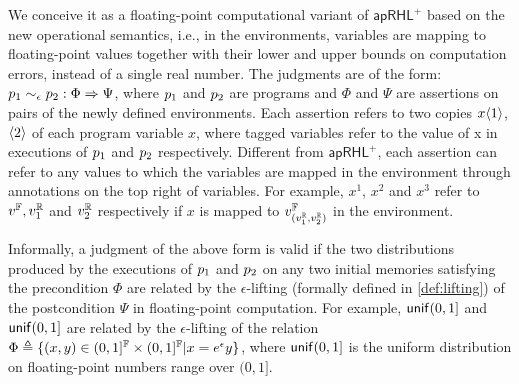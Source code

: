 \documentclass[a4paper,11pt]{article}
\begin{document}
We conceive it as a floating-point computational variant of $\mathsf{apRHL}^+$ based on the new operational semantics, i.e., in the environments, variables are mapping to floating-point values together with their lower and upper bounds on computation errors, instead of a single real number.
%
The judgments are of the form:
$
p_1 \sim_{\epsilon} p_2: \Phi \Rightarrow \Psi
$,
where $p_1$ and $p_2$ are programs and $\Phi$ and $\Psi$ are assertions on pairs of the newly defined environments.
Each assertion refers to two copies $x\langle 1 \rangle$, $\langle 2 \rangle$ of each program variable $x$, where tagged variables refer to the value of x in executions of $p_1$ and $p_2$ respectively.
%
Different from $\mathsf{apRHL}^+$, each assertion can refer to any values to which the variables are mapped in the environment through annotations on the top right of variables. 
For example, $x^1$, $x^2$ and $x^3$ refer to $v^{\mathbb{F}}, v^{\mathbb{R}}_1$ and $v^{\mathbb{R}}_2$ respectively 
if $x$ is mapped to $v^{\mathbb{F}}_{(v^{\mathbb{R}}_1, v^{\mathbb{R}}_2)}$ in the environment.
%

Informally, a judgment of the above form is valid if the two distributions produced by the executions of 
$p_1$ and $p_2$ on any two initial memories satisfying the precondition $\Phi$ are related by the $\epsilon$-lifting (formally defined in \ref{def:lifting}) of the postcondition $\Psi$ in floating-point computation. 
% 
%
For example, $\mathsf{unif}(0, 1] $ and
$\mathsf{unif}(0, 1]$ are related by the $\epsilon$-lifting of the relation $\Phi \triangleq \{(x, y) \in (0, 1]^{\mathbb{F}} \times (0, 1]^{\mathbb{F}} | x = e^{\epsilon}y\}$,
where $\mathsf{unif}(0, 1] $ is the uniform distribution on floating-point numbers range over $(0, 1]$.
%
\end{document}
